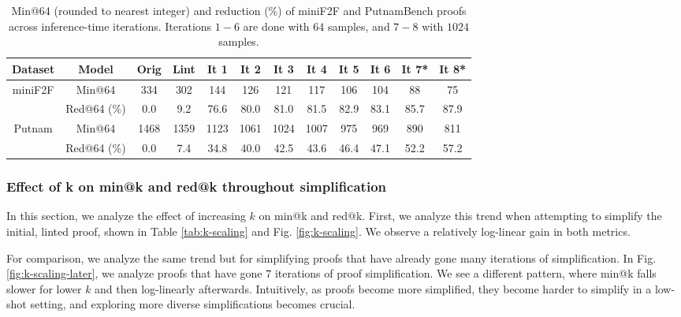 \begin{table}[H]
\caption{Min@64 (rounded to nearest integer) and reduction (\%) of miniF2F and PutnamBench proofs across inference-time iterations. Iterations $1-6$ are done with $64$ samples, and $7-8$ with $1024$ samples. }
\label{tab:inference-iteration-results-all}
\centering
\begin{tabular}{c | c | c c c c c c c c c c}
\toprule
\textbf{Dataset} & \textbf{Model} & \textbf{Orig} & \textbf{Lint} & \textbf{It 1} & \textbf{It 2} & \textbf{It 3} & \textbf{It 4} & \textbf{It 5} & \textbf{It 6} & \textbf{It 7*} & \textbf{It 8*} \\
\midrule
\multirow{2}{*}{miniF2F} 
& Min@64 & 334 & 302 & 144 & 126 & 121 & 117 & 106 & 104 & 88 & 75 \\
& Red@64 (\%) & 0.0 & 9.2 & 76.6 & 80.0 & 81.0 & 81.5 & 82.9 & 83.1 & 85.7 & 87.9 \\
\midrule
\multirow{2}{*}{Putnam} 
& Min@64 & 1468 & 1359 & 1123 & 1061 & 1024 & 1007 & 975 & 969 & 890 & 811 \\
& Red@64 (\%) & 0.0 & 7.4 & 34.8 & 40.0 & 42.5 & 43.6 & 46.4 & 47.1 & 52.2 & 57.2 \\
\bottomrule
\end{tabular}
\end{table}

\subsubsection{Effect of k on min@k and red@k throughout simplification} \label{subsec-effect-of-k}
In this section, we analyze the effect of increasing $k$ on min@k and red@k. First, we analyze this trend when attempting to simplify the initial, linted proof, shown in Table \ref{tab:k-scaling} and Fig. \ref{fig:k-scaling}. We observe a relatively log-linear gain in both metrics. 

For comparison, we analyze the same trend but for simplifying proofs that have already gone many iterations of simplification. In Fig. \ref{fig:k-scaling-later}, we analyze proofs that have gone $7$ iterations of proof simplification. We see a different pattern, where min@k falls slower for lower $k$ and then log-linearly afterwards. Intuitively, as proofs become more simplified, they become harder to simplify in a low-shot setting, and exploring more diverse simplifications becomes crucial. 


